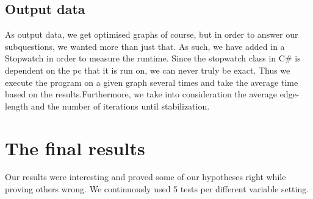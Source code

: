 \documentclass[a4paper,12pt]{article}
\begin{document}
\subsection{Output data}
As output data, we get optimised graphs of course, but in order to answer our subquestions, we wanted more than just that. As such, we have added in a Stopwatch in order to measure the runtime. Since the stopwatch class in C\# is dependent on the pc that it is run on, we can never truly be exact. Thus we execute the program on a given graph several times and take the average time based on the results.Furthermore, we take into consideration the average edge-length and the number of iterations until stabilization.

\section{The final results}\label{s:results}
Our results were interesting and proved some of our hypotheses right while proving others wrong. We continuously used 5 tests per different variable setting.
\end{document}
